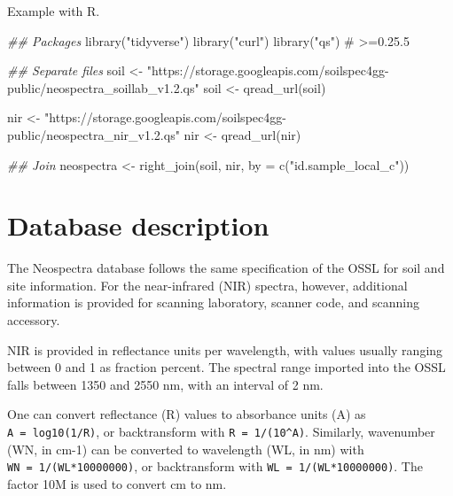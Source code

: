 \documentclass[
  letterpaper,
  DIV=11,
  numbers=noendperiod]{scrreprt}
\newenvironment{Shaded}{\begin{snugshade}}{\end{snugshade}}
\newcommand{\AttributeTok}[1]{\textcolor[rgb]{0.40,0.45,0.13}{#1}}
\newcommand{\CommentTok}[1]{\textcolor[rgb]{0.37,0.37,0.37}{#1}}
\newcommand{\DocumentationTok}[1]{\textcolor[rgb]{0.37,0.37,0.37}{\textit{#1}}}
\newcommand{\FunctionTok}[1]{\textcolor[rgb]{0.28,0.35,0.67}{#1}}
\newcommand{\NormalTok}[1]{\textcolor[rgb]{0.00,0.23,0.31}{#1}}
\newcommand{\OtherTok}[1]{\textcolor[rgb]{0.00,0.23,0.31}{#1}}
\newcommand{\StringTok}[1]{\textcolor[rgb]{0.13,0.47,0.30}{#1}}
\begin{document}
Example with R.

\begin{Shaded}
\begin{Highlighting}[]
\DocumentationTok{\#\# Packages}
\FunctionTok{library}\NormalTok{(}\StringTok{"tidyverse"}\NormalTok{)}
\FunctionTok{library}\NormalTok{(}\StringTok{"curl"}\NormalTok{)}
\FunctionTok{library}\NormalTok{(}\StringTok{"qs"}\NormalTok{) }\CommentTok{\# \textgreater{}=0.25.5}

\DocumentationTok{\#\# Separate files}
\NormalTok{soil }\OtherTok{\textless{}{-}}  \StringTok{"https://storage.googleapis.com/soilspec4gg{-}public/neospectra\_soillab\_v1.2.qs"}
\NormalTok{soil }\OtherTok{\textless{}{-}} \FunctionTok{qread\_url}\NormalTok{(soil)}

\NormalTok{nir }\OtherTok{\textless{}{-}} \StringTok{"https://storage.googleapis.com/soilspec4gg{-}public/neospectra\_nir\_v1.2.qs"}
\NormalTok{nir }\OtherTok{\textless{}{-}} \FunctionTok{qread\_url}\NormalTok{(nir)}

\DocumentationTok{\#\# Join}
\NormalTok{neospectra }\OtherTok{\textless{}{-}} \FunctionTok{right\_join}\NormalTok{(soil, nir, }\AttributeTok{by =} \FunctionTok{c}\NormalTok{(}\StringTok{"id.sample\_local\_c"}\NormalTok{))}
\end{Highlighting}
\end{Shaded}

\section{Database description}\label{database-description}

The Neospectra database follows the same specification of the OSSL for
soil and site information. For the near-infrared (NIR) spectra, however,
additional information is provided for scanning laboratory, scanner
code, and scanning accessory.

NIR is provided in reflectance units per wavelength, with values usually
ranging between 0 and 1 as fraction percent. The spectral range imported
into the OSSL falls between 1350 and 2550 nm, with an interval of 2 nm.

One can convert reflectance (R) values to absorbance units (A) as
\texttt{A\ =\ log10(1/R)}, or backtransform with
\texttt{R\ =\ 1/(10\^{}A)}. Similarly, wavenumber (WN, in cm-1) can be
converted to wavelength (WL, in nm) with
\texttt{WN\ =\ 1/(WL*10000000)}, or backtransform with
\texttt{WL\ =\ 1/(WL*10000000)}. The factor 10M is used to convert cm to
nm.
\end{document}
